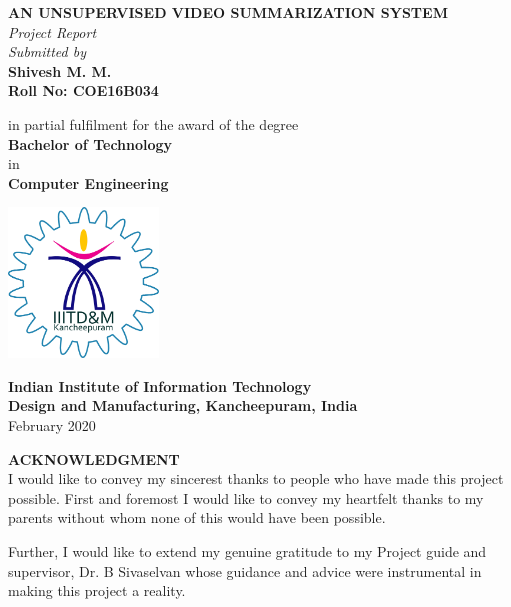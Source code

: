 \documentclass{article}
\makeatletter
\newcommand\frontmatter{%
    \cleardoublepage
  \pagenumbering{roman}}
\makeatother
\begin{document}
	\begin{center}
	{ \Large {\bf AN UNSUPERVISED VIDEO SUMMARIZATION SYSTEM } }\\ 
	\vspace{1.5cm}
\textit{	Project Report\\
	\vspace{0.5cm}
	Submitted by\\}
	\vspace{0.7cm}
	\large {\bf Shivesh M. M.}\\
	\vspace{0.3cm}
	\large {\bf Roll No: COE16B034}
	
	\vspace{0.75cm}
	in partial fulfilment for the award of the degree\\
	\vspace{0.75cm}
	\large {\bf Bachelor of Technology}\\
		\vspace{0.5cm}
	in\\
		\vspace{0.5cm}
	\large {\bf Computer Engineering}
	\vspace*{1cm}
	\begin{center}
	\includegraphics[width=0.3\textwidth]{iiitdm}
	\end{center}
	\vspace{10pt}
	\large{\bf Indian Institute of Information Technology }\\
	\vspace{5 pt}
	\large{\bf Design and Manufacturing, Kancheepuram, India}\\
	\vspace{20 pt}
	February 2020
	\end{center}

\newpage
\frontmatter
\thispagestyle{empty}
\vspace*{2.5cm}
\begin{center}
\large{\bf ACKNOWLEDGMENT}\\
\vspace{1.5cm}
I would like to convey my sincerest thanks to people who have made this project possible. First and foremost I would like to convey my heartfelt thanks to my parents without whom none of this would have been possible.

Further, I would like to extend my genuine gratitude to my Project guide and supervisor, Dr. B Sivaselvan whose guidance and advice were instrumental in making this project a reality.

\end{center}
\end{document}
